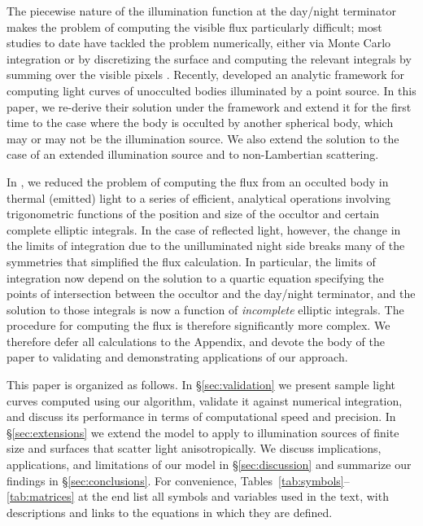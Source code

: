 \documentclass[modern]{aastex62}
\begin{document}
The piecewise nature of the illumination function at the day/night terminator
makes the problem of computing the visible flux particularly difficult; most
studies to date have tackled the problem numerically, either
via Monte Carlo integration \citep[e.g.,][]{Ford2001} or by discretizing the surface
and computing the relevant integrals by summing over the visible
pixels \citep[e.g.,][]{Kawahara2010,Fujii2012}.
Recently, \citet{Haggard2018} developed an analytic
framework for computing light curves of unocculted bodies illuminated
by a point source. In this paper, we re-derive their solution under the
\starry framework and extend it for the first time to the case where
the body is occulted by another spherical body, which may or may not be the
illumination source. We also extend the solution to the case of an extended
illumination source and to non-Lambertian scattering.

In \citet{Luger2019}, we reduced the problem of computing the flux from
an occulted body in thermal (emitted) light to a series of efficient, analytical
operations involving trigonometric functions of the position and size of the
occultor and certain complete elliptic integrals. In the case of reflected
light, however, the change in the limits of integration due to the
unilluminated night side breaks many of the symmetries that simplified
the flux calculation. In particular, the limits of integration now depend
on the solution to a quartic equation specifying the points of intersection
between the occultor and the day/night terminator, and the solution to
those integrals is now a function of \emph{incomplete} elliptic integrals.
The procedure for computing the flux is therefore significantly more complex.
%
We therefore defer all calculations to the Appendix, and devote the body of
the paper to validating and demonstrating applications of our approach.

This paper is organized as follows.
In \S\ref{sec:validation} we present sample light curves computed
using our algorithm, validate it against numerical integration, and
discuss its performance in terms of computational speed and precision.
In \S\ref{sec:extensions} we extend the model to apply to illumination
sources of finite size and surfaces that scatter light anisotropically.
We discuss implications, applications, and limitations of our model in
\S\ref{sec:discussion} and summarize our findings in \S\ref{sec:conclusions}.
For convenience, Tables~\ref{tab:symbols}--\ref{tab:matrices} at the end
list all symbols and variables used in the text, with descriptions and
links to the equations in which they are defined.
\end{document}
